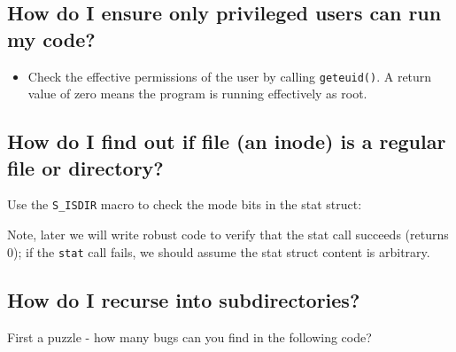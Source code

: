 \subsection{How do I ensure only privileged users can run my
code?}\label{how-do-i-ensure-only-privileged-users-can-run-my-code}

\begin{itemize}
\tightlist
\item
  Check the effective permissions of the user by calling
  \texttt{geteuid()}. A return value of zero means the program is
  running effectively as root.
\end{itemize}

\subsection{How do I find out if file (an inode) is a regular file or
directory?}\label{how-do-i-find-out-if-file-an-inode-is-a-regular-file-or-directory}

Use the \texttt{S\_ISDIR} macro to check the mode bits in the stat
struct:

\begin{Shaded}
\begin{Highlighting}[]
 
 
\end{Highlighting}
\end{Shaded}

Note, later we will write robust code to verify that the stat call
succeeds (returns 0); if the \texttt{stat} call fails, we should assume
the stat struct content is arbitrary.

\subsection{How do I recurse into
subdirectories?}\label{how-do-i-recurse-into-subdirectories}

First a puzzle - how many bugs can you find in the following code?

\begin{Shaded}
\end{Shaded}

